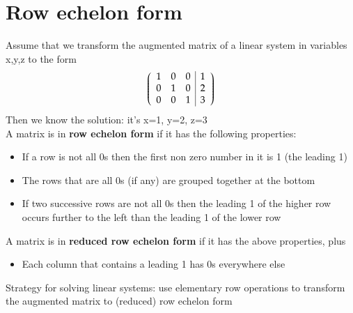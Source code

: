 \documentclass{article}[18pt]
\begin{document}
\section{Row echelon form}
Assume that we transform the augmented matrix of a linear system in variables x,y,z to the form
$$\left( \begin{array} { c c c | c } { 1 } & { 0 } & { 0 } & { 1 } \\ { 0 } & { 1 } & { 0 } & { 2 } \\ { 0 } & { 0 } & { 1 } & { 3 } \end{array} \right)$$
Then we know the solution: it's x=1, y=2, z=3\\
A matrix is in \textbf{row echelon form} if it has the following properties:
\begin{itemize}
\item If a row is not all 0s then the first non zero number in it is 1 (the leading 1)
\item The rows that are all 0s (if any) are grouped together at the bottom
\item If two successive rows are not all 0s then the leading 1 of the higher row occurs further to the left than the leading 1 of the lower row
\end{itemize}
A matrix is in \textbf{reduced row echelon form} if it has the above properties, plus
\begin{itemize}
\item Each column that contains a leading 1 has 0s everywhere else
\end{itemize}
Strategy for solving linear systems: use elementary row operations to transform the augmented matrix to (reduced) row echelon form
\end{document}
